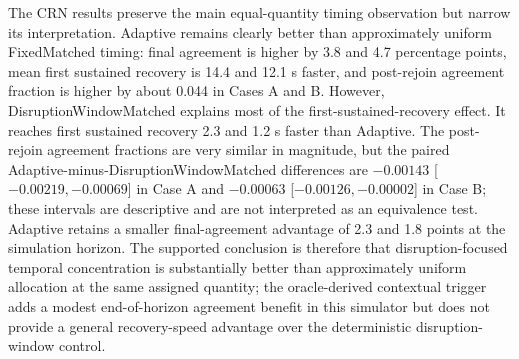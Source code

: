 \documentclass[11pt]{article}
\begin{document}
\begin{table}[H]
\centering
\caption{Additional paired CRN durability effects from the same 20,000-resample paired-bootstrap analysis. Agreement-fraction differences and agreement-loss-episode differences are first policy minus second policy with 95\% paired-bootstrap intervals. The final column gives the discordant final-agreement counts used by the exact McNemar tests as first-policy success/second-policy failure : first-policy failure/second-policy success.}
\label{tab:crn-durability-effects}
\scriptsize
{}
\end{table}

The CRN results preserve the main equal-quantity timing observation but narrow its interpretation. Adaptive remains clearly better than approximately uniform FixedMatched timing: final agreement is higher by 3.8 and 4.7 percentage points, mean first sustained recovery is 14.4 and 12.1 s faster, and post-rejoin agreement fraction is higher by about 0.044 in Cases A and B. However, DisruptionWindowMatched explains most of the first-sustained-recovery effect. It reaches first sustained recovery 2.3 and 1.2 s faster than Adaptive. The post-rejoin agreement fractions are very similar in magnitude, but the paired Adaptive-minus-DisruptionWindowMatched differences are $-0.00143$ [$-0.00219,-0.00069$] in Case A and $-0.00063$ [$-0.00126,-0.00002$] in Case B; these intervals are descriptive and are not interpreted as an equivalence test. Adaptive retains a smaller final-agreement advantage of 2.3 and 1.8 points at the simulation horizon. The supported conclusion is therefore that disruption-focused temporal concentration is substantially better than approximately uniform allocation at the same assigned quantity; the oracle-derived contextual trigger adds a modest end-of-horizon agreement benefit in this simulator but does not provide a general recovery-speed advantage over the deterministic disruption-window control.
\end{document}

